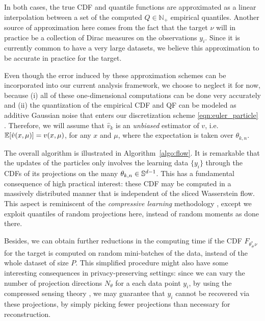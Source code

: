 In both cases, the true CDF and quantile functions are approximated as a linear interpolation between a set of the computed $Q\in\mathbb{N}_+$ empirical quantiles.
Another source of approximation here comes from the fact that the target $\nu$ will in practice be a collection of Dirac measures on the observations $y_i$. Since it is currently common to have a very large datasets, we believe this approximation to be accurate in practice for the target.

Even though the error induced by these approximation schemes can be incorporated into our current analysis framework, we choose to neglect it for now, because (i) all of these one-dimensional computations can be done very accurately and (ii) the quantization of the empirical CDF and QF can be modeled as additive Gaussian noise that enters our discretization scheme \eqref{eqn:euler_particle} \cite{van1998asymptotic}. Therefore, we will assume that $\hat{v}_k$ is an \emph{unbiased} estimator of $v$, i.e.\ $\mathbb{E}[\hat{v}(x,\mu)] = v(x,\mu)$, for any $x$ and $\mu$, where the expectation is taken over $\theta_{k,n}$.



The overall algorithm is illustrated in Algorithm~\ref{algo:flow}. It is remarkable that the updates of the particles only involves the learning data $\{y_i\}$ through the CDFs of its projections on the many $\theta_{k,n}\in\mathbb{S}^{d-1}$. This has a fundamental consequence of high practical interest: these CDF may be computed in a massively distributed manner that is independent of the sliced Wasserstein flow. This aspect is reminiscent of the \textit{compressive learning} methodology \cite{gribonval2017compressive}, except we exploit quantiles of random projections here, instead of random moments as done there.



Besides, we can obtain further reductions in the computing time if the CDF $F_{\theta^*_\#\nu}$ for the target is computed on random mini-batches of the data, instead of the whole dataset of size $P$. This simplified procedure might also have some interesting consequences in privacy-preserving settings: since we can vary the number of projection directions $N_\theta$ for a each data point $y_i$, by using the compressed sensing theory \cite{donoho2009observed}, we may guarantee that $y_i$ cannot be recovered via these projections, by simply picking fewer projections than necessary for reconstruction.




